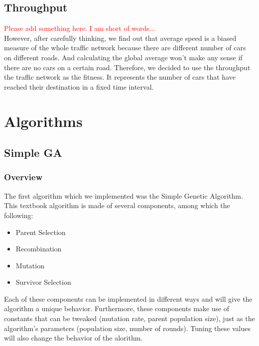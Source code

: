 \documentclass{article} %
\begin{document}

\subsection{Throughput}
\textcolor{red}{Please add something here. I am short of words...}\\
However, after carefully thinking, we find out that average speed is a biased measure of the whole traffic network because there are different number of cars on different roads. And calculating the global average won't make any sense if there are no cars on a certain road. Therefore, we decided to use the throughput the traffic network as the fitness. It represents the number of cars that have reached their destination in a fixed time interval.

\section{Algorithms}

\subsection{Simple GA}

\subsubsection{Overview}
The first algorithm which we implemented was the Simple Genetic Algorithm. This textbook algorithm is made of several components, among which the following:
\begin{itemize}
 \item Parent Selection
 \item Recombination
 \item Mutation
 \item Survivor Selection
\end{itemize}
Each of these components can be implemented in different ways and will give the algorithm a unique behavior. Furthermore, these components make use of constants that can be tweaked (mutation rate, parent population size), just as the algorithm's parameters (population size, number of rounds). Tuning these values will also change the behavior of the alorithm.
\end{document}
